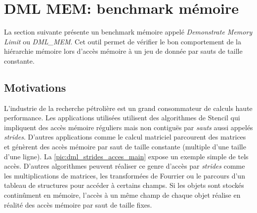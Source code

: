 \section{DML MEM: benchmark mémoire}\label{sec:dmlmem}

    La section suivante présente un benchmark mémoire appelé \textit{Demonstrate Memory Limit} ou \textit{DML\_MEM}. Cet outil permet de vérifier le bon comportement de la hiérarchie mémoire lors d'accès mémoire à un jeu de donnée par sauts de taille constante. 

    

    \subsection{Motivations}
    
        L'industrie de la recherche pétrolière est un grand consommateur de calculs haute performance. Les applications utilisées utilisent des algorithmes de Stencil qui impliquent des accès mémoire réguliers mais non contiguës par \textit{sauts} aussi appelés \textit{strides}. D'autres applications comme le calcul matriciel parcourent des matrices et génèrent des accès mémoire par saut de taille constante (multiple d'une taille d'une ligne). La \autoref{pic:dml_strides_acces_main} expose un exemple simple de tels accès. D'autres algorithmes peuvent réaliser ce genre d'accès par \textit{strides} comme les multiplications de matrices, les transformées de Fourrier ou le parcours d'un tableau de structures pour accéder à certains champs. Si les objets sont stockés continûment en mémoire, l'accès à un même champ de chaque objet réalise en réalité des accès mémoire par saut de taille fixes. 
        
